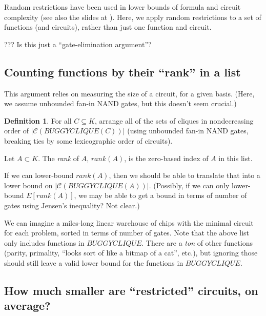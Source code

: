 \documentclass[12pt]{article}
\theoremstyle{definition}
\newtheorem{defn}{Definition}[section]
\newcommand{\bigC}[0]{\mathcal{C}}
\begin{document}
Random restrictions have been used in lower bounds of formula
\cite{subbotovskaya1963comparison} and circuit \cite{hastad1987lower}
complexity (see also the slides at \cite{rossmanRestrictions}).
Here, we apply random restrictions to a set of functions (and circuits),
rather than just one function and circuit.

??? Is this just a ``gate-elimination argument''?

\subsection{Counting functions by their ``rank'' in a list}

This argument relies on measuring the size of a circuit,
for a given basis. (Here, we assume unbounded fan-in
NAND gates, but this doesn't seem crucial.)

\begin{defn}
\label{Rank}
For all $C \subseteq K$,
arrange all of the sets of cliques in nondecreasing order
of $|\bigC(BUGGYCLIQUE(C))|$ (using unbounded fan-in NAND gates,
breaking ties by some lexicographic order of circuits).

Let $A \subset K$. The {\em rank} of $A$, $rank(A)$, is the zero-based
index of $A$ in this list.
\end{defn}

If we can lower-bound $rank(A)$, then we should be able to translate
that into a
lower bound on $|\bigC(BUGGYCLIQUE(A))|$. (Possibly, if we
can only lower-bound $E[rank(A)]$, we may be able to get
a bound in terms of number of gates using Jensen's inequality?
Not clear.)

We can imagine a miles-long linear warehouse of chips with the minimal
circuit for each problem, sorted in terms of number of gates.
Note that the above list only includes functions in $BUGGYCLIQUE$.
There are a {\em ton} of other functions (parity, primality, ``looks
sort of like a bitmap of a cat'', etc.), but ignoring
those should still leave a valid lower bound for the functions in $BUGGYCLIQUE$.

\subsection{How much smaller are ``restricted'' circuits, on average?}
\end{document}
